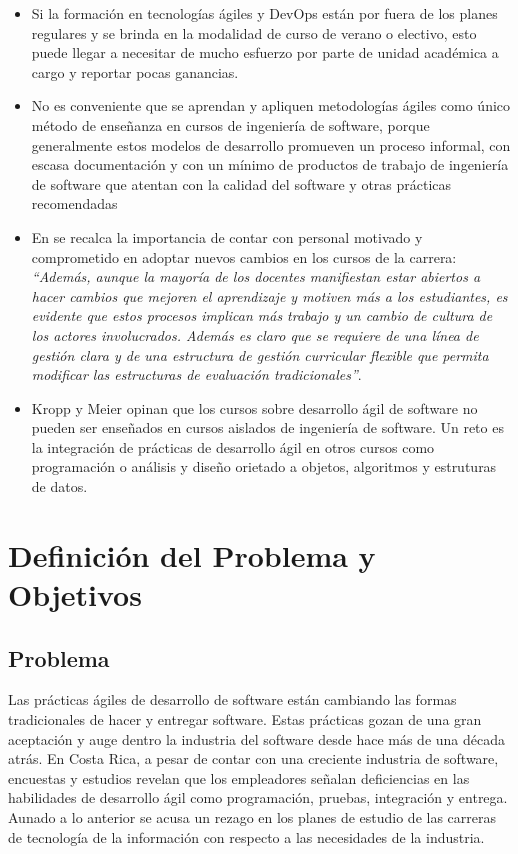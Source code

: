 \documentclass[journal]{IEEEtran}
\begin{document}
\begin{itemize}
        \item Si la formación en tecnologías ágiles y DevOps están por fuera de los planes regulares y se brinda en la modalidad de curso de verano o electivo, esto puede llegar a necesitar de mucho esfuerzo por parte de unidad académica a cargo y reportar pocas ganancias\cite{hickey-salas}.
        \item No es conveniente que se aprendan y apliquen metodologías ágiles como único método de enseñanza en cursos de ingeniería de software, porque generalmente estos modelos de desarrollo promueven un proceso informal, con escasa documentación y con un mínimo de productos de trabajo de ingeniería de software que atentan con la calidad del software y otras prácticas recomendadas\cite{salazar}
        \item En \cite{mora-et-al-1} se recalca la importancia de contar con personal motivado y comprometido en adoptar nuevos cambios en los cursos de la carrera: \emph{``Además, aunque la mayoría de los docentes manifiestan estar abiertos a hacer cambios que mejoren el aprendizaje y motiven más a los estudiantes, es evidente que estos procesos implican más trabajo y un cambio de cultura de los actores involucrados. Además es claro que se requiere de una línea de gestión clara y de una estructura de gestión curricular flexible que permita modificar las estructuras de evaluación tradicionales''}.
        \item Kropp y Meier \cite{kropp-meier-1} opinan que los cursos sobre desarrollo ágil de software no pueden ser enseñados en cursos aislados de ingeniería de software. Un reto es la integración de prácticas de desarrollo ágil en otros cursos como programación o análisis y diseño orietado a objetos, algoritmos y estruturas de datos.
\end{itemize}


\section{Definición del Problema y Objetivos} \label{sec:problema-objetivos}

\subsection{Problema}
Las prácticas ágiles de desarrollo de software están cambiando las formas tradicionales de hacer y entregar software. Estas prácticas gozan de una gran aceptación y auge dentro la industria del software desde hace más de una década atrás. En Costa Rica, a pesar de contar con una creciente industria de software, encuestas y estudios revelan que los empleadores señalan deficiencias en las habilidades de desarrollo ágil como programación, pruebas, integración y entrega. Aunado a lo anterior se acusa un rezago en los planes de estudio de las carreras de tecnología de la información con respecto a las necesidades de la industria.
\end{document}
